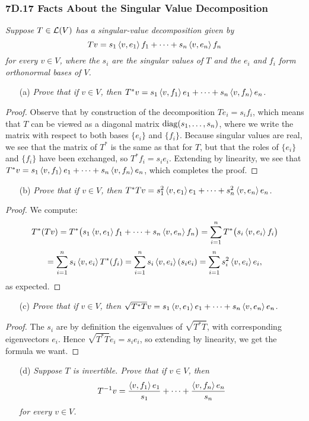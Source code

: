 \documentclass{article}
\begin{document}
\subsubsection*{7D.17 Facts About the Singular Value Decomposition}
\textit{Suppose $T\in\mathcal L(V)$ has a singular-value decomposition given by $$Tv =s_1 \left\langle v,e_1\right\rangle f_1+\cdots+ s_n\left\langle v,e_n\right\rangle f_n$$
for every $v\in V$, where the $s_i$ are the singular values of $T$ and the $e_i$ and $f_i$ form orthonormal bases of $V$.}
\begin{itemize}
    \item[(a)] \textit{Prove that if $v\in V$, then $T^*v = s_1\left\langle v, f_1\right\rangle e_1 + \cdots + s_n\left\langle v, f_n\right\rangle e_n$.}
\end{itemize}
\begin{proof}
Observe that by construction of the decomposition $Te_i = s_if_i$, which means that $T$ can be viewed as a diagonal matrix $\operatorname{diag}(s_1, \ldots, s_n)$, where we write the matrix with respect to both bases $\{e_i\}$ and $\{f_i\}$. Because singular values are real, we see that the matrix of $T^*$ is the same as that for $T$, but that the roles of $\{e_i\}$ and $\{f_i\}$ have been exchanged, so $T^*f_i = s_i e_i$. Extending by linearity, we see that $T^*v = s_1\left\langle v, f_1\right\rangle e_1 + \cdots + s_n\left\langle v, f_n\right\rangle e_n$, which completes the proof.
\end{proof}
\begin{itemize}
    \item[(b)] \textit{Prove that if $v\in V$, then $T^*Tv = s_1^2\left\langle v, e_1\right\rangle e_1+\cdots + s_n^2\left\langle v, e_n\right\rangle e_n$.}
\end{itemize}
\begin{proof}
We compute:
$$T^*(Tv)  = T^*\big(s_1\left\langle v, e_1\right\rangle f_1 + \cdots + s_n\left\langle v, e_n\right\rangle f_n\big) = \sum_{i=1}^n T^*\big(s_i\left\langle v, e_i\right\rangle f_i\big)$$
$$=\sum_{i=1}^n s_i\left\langle v, e_i\right\rangle T^*(f_i) = \sum_{i=1}^n s_i\left\langle v, e_i\right\rangle(s_ie_i) = \sum_{i=1}^n s_i^2\left\langle v, e_i\right\rangle e_i,$$
as expected.
\end{proof}
\begin{itemize}
    \item[(c)] \textit{Prove that if $v\in V$, then $\sqrt{T^*T}v = s_1\left\langle v, e_1\right\rangle e_1 + \cdots + s_n\left\langle v, e_n\right\rangle e_n$.}
\end{itemize}
\begin{proof}
The $s_i$ are by definition the eigenvalues of $\sqrt{T^*T}$, with corresponding eigenvectors $e_i$. Hence $\sqrt{T^*T}e_i = s_ie_i$, so extending by linearity, we get the formula we want.
\end{proof}
\begin{itemize}
    \item[(d)] \textit{Suppose $T$ is invertible. Prove that if $v\in V$, then}
    $$T^{-1}v = \frac{\left\langle v, f_1\right\rangle e_1}{s_1} + \cdots + \frac{\left\langle v, f_n\right\rangle e_n}{s_n}$$
    \textit{for every $v\in V$.}
\end{itemize}
\end{document}
